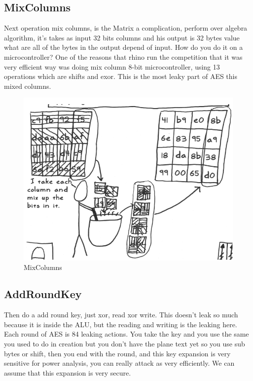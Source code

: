 \subsection{MixColumns}

Next operation mix columns, is the Matrix a complication, perform over algebra
algorithm, it's takes as input 32 bits columns and his output is 32 bytes value
what are all of the bytes in the output depend of input. How do you do it on a
microcontroller? One of the reasons that rhino run the competition that it was
very efficient way was doing mix column 8-bit microcontroller, using 13
operations which are shifts and exor. This is the most leaky part of AES this
mixed columns.

\begin{figure}[htp]
\centering
\includegraphics[scale=0.2]{images/Lecture_5/mixcolumns.png}
\caption{MixColumns}\label{fig:MixColumns}
\end{figure}

\subsection{AddRoundKey}

Then do a add round key, just xor, read xor write. This doesn't leak so much
because it is inside the ALU, but the reading and writing is the leaking here.
Each round of AES is 84 leaking actions. You take the key and you use the same
you used to do in creation but you don't have the plane text yet so you use sub
bytes or shift, then you end with the round, and this key expansion is very
sensitive for power analysis, you can really attack as very efficiently. We can
assume that this expansion is very secure.


